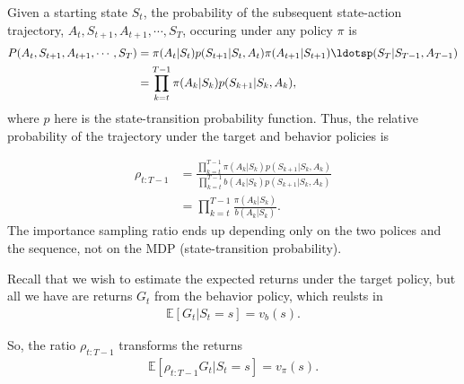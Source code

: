 Given a starting state $S_t$, the probability of the subsequent state-action trajectory, $A_t, S_{t+1}, A_{t+1},\cdots,S_T$, occuring under any policy $\pi$ is 
\begin{align*}
	P(A_t, S_{t+1}, A_{t+1},\cdots,S_T)&= \pi(A_t|S_t)p(S_{t+1}|S_t,A_t)\pi(A_{t+1}|S_{t+1})\ldotsp(S_T|S_{T-1},A_{T-1})\\ 
	&= \prod_{k=t}^{T-1}\pi(A_k|S_k)p(S_{k+1}|S_k,A_k),
\end{align*}
where $p$ here is the state-transition probability function. Thus, the relative probability of the trajectory under the target and behavior policies is 

\begin{align*}
	\rho_{t:T-1} &=  \frac{\prod_{k=t}^{T-1}\pi(A_k|S_k)p(S_{k+1}|S_k,A_k)}{ \prod_{k=t}^{T-1}b(A_k|S_k)p(S_{k+1}|S_k,A_k)}\\
	&= \prod_{k=t}^{T-1}\frac{\pi(A_k|S_k)}{b(A_k|S_k)}.
	\label{eq:importance_sampling_ratio}
\end{align*}
The importance sampling ratio ends up depending only on the two polices and the sequence, not on the MDP (state-transition probability).

Recall that we wish to estimate the expected returns under the target policy, but all we have are returns $G_t$ from the behavior policy, which reulsts in 
\begin{align*}
	\mathbb{E}[G_t|S_t=s] = v_b(s).
\end{align*}

So, the ratio $\rho_{t:T-1}$ transforms the returns
\begin{align*}
	\mathbb{E}[\rho_{t:T-1} G_t|S_t=s] = v_\pi(s).
\end{align*}



%

